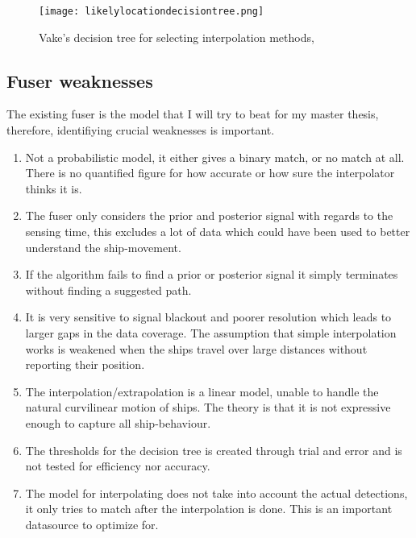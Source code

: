 \begin{figure}[h]
	\texttt{[image: likelylocationdecisiontree.png]}
	\centering
	\caption{Vake's decision tree for selecting interpolation methods,  }
	\centering
	\label{fig:decisiontree}
\end{figure}

\subsection{Fuser weaknesses}

The existing fuser is the model that I will try to beat for my master thesis, therefore, identifiying crucial weaknesses is important.  

\begin{enumerate}
	\item Not a probabilistic model, it either gives a binary match, or no match at all. There is no quantified figure for how accurate or how sure the interpolator thinks it is. 
	\item The fuser only considers the prior and posterior signal with regards to the sensing time, this excludes a lot of data which could have been used to better understand the ship-movement. 
	\item If the algorithm fails to find a prior or posterior signal it simply terminates without finding a suggested path. 
	\item It is very sensitive to signal blackout and poorer resolution which leads to larger gaps in the data coverage. The assumption that simple interpolation works is weakened when the ships travel over large distances without reporting their position. 
	\item The interpolation/extrapolation is a linear model, unable to handle the natural curvilinear motion of ships. The theory is that it is not expressive enough to capture all ship-behaviour. 
	\item The thresholds for the decision tree is created through trial and error and is not tested for efficiency nor accuracy.
	\item The model for interpolating does not take into account the actual detections, it only tries to match after the interpolation is done. This is an important datasource to optimize for. 
\end{enumerate}	





